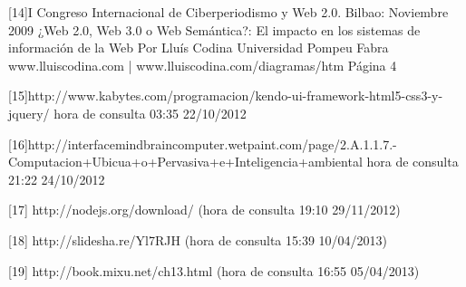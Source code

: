 [14]I Congreso Internacional de Ciberperiodismo y Web 2.0. Bilbao: Noviembre 2009
    ¿Web 2.0, Web 3.0 o Web Semántica?: El impacto en los sistemas de
    información de la Web
    Por Lluís Codina
    Universidad Pompeu Fabra
    www.lluiscodina.com | www.lluiscodina.com/diagramas/htm
    Página 4
    
[15]http://www.kabytes.com/programacion/kendo-ui-framework-html5-css3-y-jquery/ hora de consulta 03:35 22/10/2012

[16]http://interfacemindbraincomputer.wetpaint.com/page/2.A.1.1.7.-Computacion+Ubicua+o+Pervasiva+e+Inteligencia+ambiental hora de consulta 
21:22 24/10/2012

[17] http://nodejs.org/download/ (hora de consulta 19:10 29/11/2012) 

[18] http://slidesha.re/Yl7RJH (hora de consulta 15:39 10/04/2013) 

[19] http://book.mixu.net/ch13.html (hora de consulta 16:55 05/04/2013)